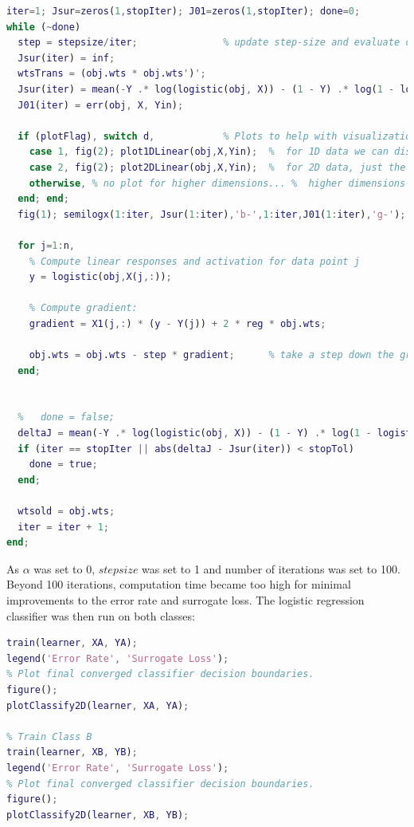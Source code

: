 \documentclass[]{report}   %
\begin{document}
\begin{lstlisting}[language=Matlab, caption=Full train.m implementation.]
% Training loop (SGD):
iter=1; Jsur=zeros(1,stopIter); J01=zeros(1,stopIter); done=0; 
while (~done) 
  step = stepsize/iter;               % update step-size and evaluate current loss values
  Jsur(iter) = inf;   
  wtsTrans = (obj.wts * obj.wts')';
  Jsur(iter) = mean(-Y .* log(logistic(obj, X)) - (1 - Y) .* log(1 - logistic(obj, X)) + reg * sum(wtsTrans));
  J01(iter) = err(obj, X, Yin);

  if (plotFlag), switch d,            % Plots to help with visualization
    case 1, fig(2); plot1DLinear(obj,X,Yin);  %  for 1D data we can display the data and the function
    case 2, fig(2); plot2DLinear(obj,X,Yin);  %  for 2D data, just the data and decision boundary
    otherwise, % no plot for higher dimensions... %  higher dimensions visualization is hard
  end; end;
  fig(1); semilogx(1:iter, Jsur(1:iter),'b-',1:iter,J01(1:iter),'g-'); drawnow;

  for j=1:n,
    % Compute linear responses and activation for data point j
    y = logistic(obj,X(j,:));

    % Compute gradient:
    gradient = X1(j,:) * (y - Y(j)) + 2 * reg * obj.wts;

    obj.wts = obj.wts - step * gradient;      % take a step down the gradient
  end;


  %   done = false;
  deltaJ = mean(-Y .* log(logistic(obj, X)) - (1 - Y) .* log(1 - logistic(obj, X)) + reg * obj.wts * obj.wts');  
  if (iter == stopIter || abs(deltaJ - Jsur(iter)) < stopTol)
    done = true;
  end;

  wtsold = obj.wts;
  iter = iter + 1;
end;
\end{lstlisting}
{ As $\alpha$ was set to 0, $stepsize$ was set to 1 and number of iterations was set to 100. Beyond 100 iterations, computation time became too high for minimal improvements to the error  rate and surrogate loss. The logistic regression classifier was then run on both classes:}
\begin{lstlisting}[language=Matlab, caption=Code to run logistic regression classifier on both data sets.]
% Train Class A
train(learner, XA, YA);
legend('Error Rate', 'Surrogate Loss');
% Plot final converged classifier decision boundaries.
figure();
plotClassify2D(learner, XA, YA);

% Train Class B
train(learner, XB, YB);
legend('Error Rate', 'Surrogate Loss');
% Plot final converged classifier decision boundaries.
figure();
plotClassify2D(learner, XB, YB);
\end{lstlisting}
\end{document}
